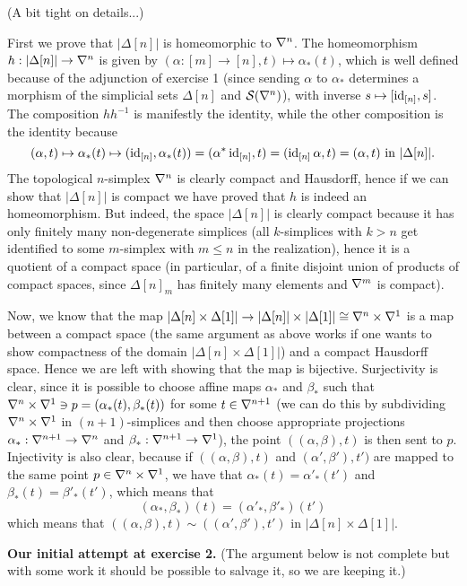 \documentclass[a4paper,11pt,english]{article}
\renewcommand{\S}[1]{\mathcal{S}(#1)}
\begin{document}
\begin{exercise}[2] (A bit tight on details...)

First we prove that $|\Delta[n]|$ is homeomorphic to $\nabla^n$. The homeomorphism $h:|\Delta[n]|\to\nabla^n$ is given by $(\alpha:[m]\to[n],t)\mapsto\alpha_*(t)$, which is well defined because of the adjunction of exercise 1 (since sending $\alpha$ to $\alpha_*$ determines a morphism of the simplicial sets $\Delta[n]$ and $\S{\nb^n}$), with inverse $s\mapsto[\operatorname{id}_{[n]},s]$. The composition $hh^{-1}$ is manifestly the identity, while the other composition is the identity because \[(\alpha,t)\mapsto \alpha_*(t)\mapsto (\operatorname{id}_{[n]},\alpha_*(t))=(\alpha^*\operatorname{id}_{[n]},t)=(\operatorname{id}_{[n]}\alpha,t)=(\alpha,t) \text{ in } |\Delta[n]|.\]
The topological $n$-simplex $\nabla^n$ is clearly compact and Hausdorff, hence if we can show that $|\Delta[n]|$ is compact we have proved that $h$ is indeed an homeomorphism. But indeed, the space $|\Delta[n]|$ is clearly compact because it has only finitely many non-degenerate simplices (all $k$-simplices with $k>n$ get identified to some $m$-simplex with $m\leq n$ in the realization), hence it is a quotient of a compact space (in particular, of a finite disjoint union of products of compact spaces, since $\Delta[n]_m$ has finitely many elements and $\nabla^m$ is compact).

Now, we know that the map $|\Delta[n]\times\Delta[1]|\to |\Delta[n]|\times|\Delta[1]|\cong \nabla^n\times\nabla^1$ is a map between a compact space (the same argument as above works if one wants to show compactness of the domain $|\Delta[n]\times\Delta[1]|$) and a compact Hausdorff space. Hence we are left with showing that the map is bijective. Surjectivity is clear, since it is possible to choose affine maps $\alpha_*$ and $\beta_*$ such that $\nabla^n\times\nabla^1\ni p=(\alpha_*(t),\beta_*(t))$ for some $t\in\nabla^{n+1}$ (we can do this by subdividing $\nabla^n\times\nabla^1$ in $(n+1)$-simplices and then choose appropriate projections $\alpha_*:\nabla^{n+1}\to\nabla^n$ and $\beta_*:\nabla^{n+1}\to\nabla^1$), the point $((\alpha,\beta),t)$ is then sent to $p$. Injectivity is also clear, because if $((\alpha,\beta),t)$ and $(\alpha',\beta'),t')$ are mapped to the same point $p\in\nabla^n\times\nabla^1$, we have that $\alpha_*(t)=\alpha'_*(t')$ and $\beta_*(t)=\beta'_*(t')$, which means that
\[(\alpha_*,\beta_*)(t)=(\alpha'_*,\beta'_*)(t')\]
which means that $((\alpha,\beta),t)\sim((\alpha',\beta'),t')$ in $|\Delta[n]\times\Delta[1]|$. \bigskip

\textbf{Our initial attempt at exercise 2.} (The argument below is not complete but with some work it should be possible to salvage it, so we are keeping it.)


\end{exercise}
\end{document}
